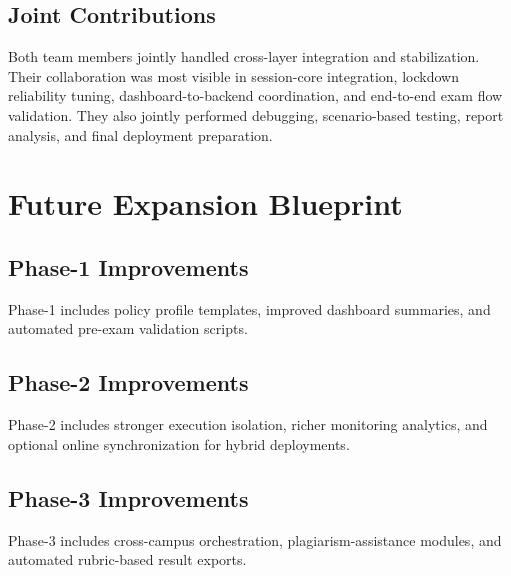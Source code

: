 \documentclass[12pt,a4paper]{report}
\begin{document}
	\subsection{Joint Contributions}
	Both team members jointly handled cross-layer integration and stabilization. Their collaboration was most visible in session-core integration, lockdown reliability tuning, dashboard-to-backend coordination, and end-to-end exam flow validation. They also jointly performed debugging, scenario-based testing, report analysis, and final deployment preparation.
	
	\section{Future Expansion Blueprint}
	\subsection{Phase-1 Improvements}
	Phase-1 includes policy profile templates, improved dashboard summaries, and automated pre-exam validation scripts.
	
	\subsection{Phase-2 Improvements}
	Phase-2 includes stronger execution isolation, richer monitoring analytics, and optional online synchronization for hybrid deployments.
	
	\subsection{Phase-3 Improvements}
	Phase-3 includes cross-campus orchestration, plagiarism-assistance modules, and automated rubric-based result exports.
	
	\newpage
	
	
	
\end{document}
